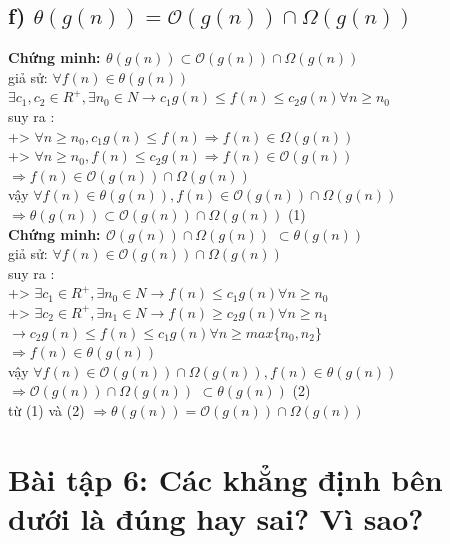 \documentclass[10pt,a4paper]{article}
\begin{document}
\subsection*{f) $\theta(g(n)) = \mathcal{O}(g(n)) \cap \Omega(g(n)) $}
\textbf{Chứng minh: $\theta(g(n)) \subset \mathcal{O}(g(n)) \cap \Omega(g(n))$}\\
giả sử: $\forall f(n) \in \theta(g(n))$\\
$\exists c_1,c_2\in R^+, \exists n_0 \in N \rightarrow c_1g(n) \leq f(n) \leq c_2g(n) \forall n \geq n_0$\\
suy ra : \\
   +> $\forall n \geq n_0,  c_1g(n) \leq f(n) \Rightarrow f(n) \in \Omega(g(n))$\\
   +> $\forall n \geq n_0,   f(n) \leq c_2g(n) \Rightarrow f(n) \in \mathcal{O}(g(n))$\\
   $\Rightarrow f(n) \in \mathcal{O}(g(n)) \cap \Omega(g(n))$\\
   vậy $\forall f(n) \in \theta(g(n)), f(n) \in \mathcal{O}(g(n)) \cap \Omega(g(n))$\\
   $\Rightarrow \theta(g(n)) \subset \mathcal{O}(g(n)) \cap \Omega(g(n))$ (1)\\
\textbf{Chứng minh: $\mathcal{O}(g(n)) \cap \Omega(g(n))$} $\subset \theta(g(n))$\\
giả sử: $\forall f(n) \in \mathcal{O}(g(n)) \cap \Omega(g(n))$\\
suy ra : \\
   +> $\exists c_1 \in R^+, \exists n_0 \in N \rightarrow f(n) \leq c_1g(n) \forall n \geq n_0$\\
   +> $\exists c_2 \in R^+, \exists n_1 \in N \rightarrow f(n) \geq c_2g(n) \forall n \geq n_1$\\
   $\rightarrow c_2g(n) \leq f(n) \leq c_1g(n)  \forall n \geq max\{n_0,n_2\}$\\
    $\Rightarrow f(n) \in \theta(g(n))$\\
   vậy $\forall f(n) \in \mathcal{O}(g(n)) \cap \Omega(g(n)), f(n) \in \theta(g(n))$\\
   $\Rightarrow \mathcal{O}(g(n)) \cap \Omega(g(n))$ $\subset \theta(g(n))$ (2)\\
từ (1) và (2) $\Rightarrow \theta(g(n)) = \mathcal{O}(g(n)) \cap \Omega(g(n)) $ 

\section*{Bài tập 6: Các khẳng định bên dưới là đúng hay sai? Vì sao?} 
\end{document}
